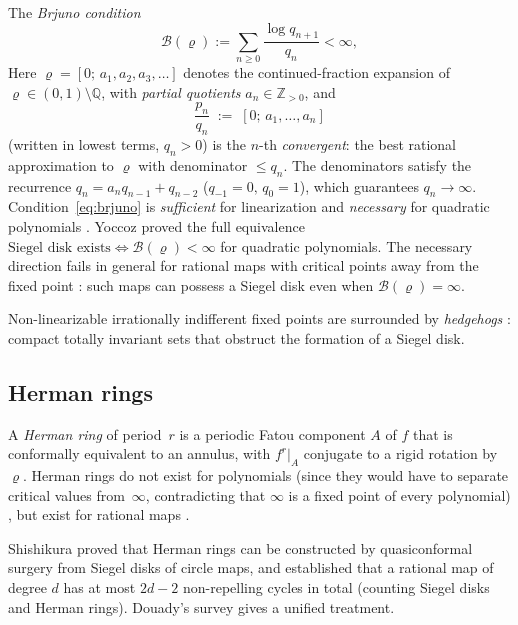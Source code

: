 \documentclass[12pt,a4paper]{article}
\newcommand{\rot}{\varrho}    %
\newcommand{\ZZ}{\mathbb{Z}}
\newcommand{\QQ}{\mathbb{Q}}
\begin{document}
The \emph{Brjuno condition} \cite{Brjuno1972}
\begin{equation}\label{eq:brjuno}
  \mathcal{B}(\rot) := \sum_{n\ge 0} \frac{\log q_{n+1}}{q_n} < \infty,
\end{equation}
Here $\rot = [0;\,a_1,a_2,a_3,\ldots]$ denotes the continued-fraction
expansion of $\rot\in(0,1)\setminus\QQ$, with \emph{partial quotients}
$a_n\in\ZZ_{>0}$, and
\[
  \frac{p_n}{q_n} \;:=\; [0;\,a_1,\ldots,a_n]
\]
(written in lowest terms, $q_n>0$) is the $n$-th \emph{convergent}:
the best rational approximation to $\rot$ with denominator $\le q_n$.
The denominators satisfy the recurrence $q_n = a_n q_{n-1}+q_{n-2}$
($q_{-1}=0,\,q_0=1$), which guarantees $q_n\to\infty$.
Condition~\eqref{eq:brjuno} is \emph{sufficient} for linearization \cite{Brjuno1972} and
\emph{necessary} for quadratic polynomials \cite{Yoccoz1988}.
Yoccoz \cite{Yoccoz1995} proved the full equivalence
$\text{Siegel disk exists} \Leftrightarrow \mathcal{B}(\rot)<\infty$
for quadratic polynomials. The necessary direction fails in general
for rational maps with critical points away from the fixed point
\cite{PerezMarco1997}: such maps can possess a Siegel disk even when
$\mathcal{B}(\rot)=\infty$.

Non-linearizable irrationally indifferent fixed points are surrounded by
\emph{hedgehogs} \cite{PerezMarco1992,PerezMarco1997}: compact totally
invariant sets that obstruct the formation of a Siegel disk.

\subsection{Herman rings}
\label{ssec:herman}

A \emph{Herman ring} of period~$r$ is a periodic Fatou component $A$ of $f$
that is conformally equivalent to an annulus, with $f^r|_A$ conjugate to a
rigid rotation by $\rot$.
Herman rings do not exist for polynomials (since they would have to separate
critical values from~$\infty$, contradicting that $\infty$ is a fixed point
of every polynomial) \cite{Milnor2006}, but exist for rational maps
\cite{Herman1979}.

Shishikura \cite{Shishikura1987} proved that Herman rings can be constructed
by quasiconformal surgery from Siegel disks of circle maps, and established
that a rational map of degree $d$ has at most $2d-2$ non-repelling cycles
in total (counting Siegel disks and Herman rings).
Douady's survey \cite{Douady1987} gives a unified treatment.
\end{document}
